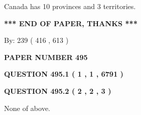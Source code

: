 \documentclass[12pt]{article}
\begin{document}
  
 
 
\noindent{}
 
 
Canada has 10  provinces and 3 territories.
 
 
 
 
   
   
 \vspace{0.2in}
 
   
   
   
   
\vspace{1.0in} 
{\textbf{\large{ *** END OF PAPER, THANKS *** }}} 
   
   
\hspace{1.0in} By: 
 239 ( 416 ,  613 )
   
   
   
   
\newpage 
\setcounter{page}{ 
   495001 } 
   
   
   
   
 {\textbf{ \Large{ PAPER NUMBER  495  }}}
   
   
\vspace{0.2in}
   
   
   
   
   
   
 \vspace{0.2in}
 
 
 
 
   
   
  
\vspace{0.2in}
  
{\textbf{\Large{QUESTION
495.1 
 ( 1 , 1 , 6791 )
}}}
  
  
  
\vspace{0.2in}
  
{\textbf{\Large{QUESTION
495.2 
 ( 2 , 2 , 3 )
}}}
  
  
 
 
\noindent{}
 
 
 None of above.
 
 
 
 
   
   
 \vspace{0.2in}
 
\end{document}
